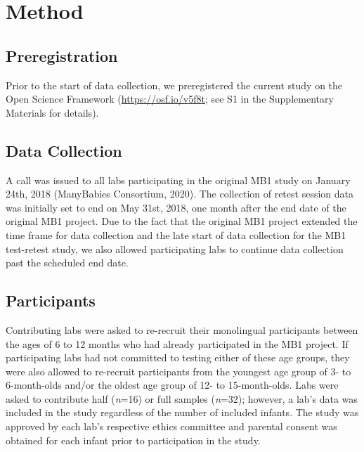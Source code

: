 \documentclass[
  man,floatsintext]{apa6}
\begin{document}
\hypertarget{method}{%
\section{Method}\label{method}}

\hypertarget{preregistration}{%
\subsection{Preregistration}\label{preregistration}}

Prior to the start of data collection, we preregistered the current study on the Open Science Framework (\url{https://osf.io/v5f8t}; see S1 in the Supplementary Materials for details).

\hypertarget{data-collection}{%
\subsection{Data Collection}\label{data-collection}}

A call was issued to all labs participating in the original MB1 study on January 24th, 2018 (ManyBabies Consortium, 2020). The collection of retest session data was initially set to end on May 31st, 2018, one month after the end date of the original MB1 project. Due to the fact that the original MB1 project extended the time frame for data collection and the late start of data collection for the MB1 test-retest study, we also allowed participating labs to continue data collection past the scheduled end date.

\hypertarget{participants}{%
\subsection{Participants}\label{participants}}

Contributing labs were asked to re-recruit their monolingual participants between the ages of 6 to 12 months who had already participated in the MB1 project.
If participating labs had not committed to testing either of these age groups, they were also allowed to re-recruit participants from the youngest age group of 3- to 6-month-olds and/or the oldest age group of 12- to 15-month-olds.
Labs were asked to contribute half (\emph{n}=16) or full samples (\emph{n}=32); however, a lab's data was included in the study regardless of the number of included infants.
The study was approved by each lab's respective ethics committee and parental consent was obtained for each infant prior to participation in the study.
\end{document}
